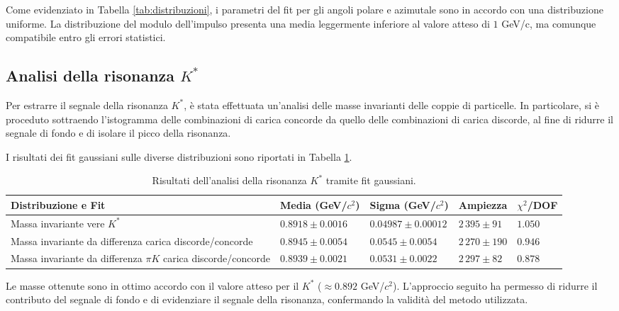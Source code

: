 \documentclass[a4paper,11pt]{article}
\begin{document}
Come evidenziato in Tabella \ref{tab:distribuzioni}, i parametri del fit per gli angoli polare e azimutale sono in accordo con una distribuzione uniforme. La distribuzione del modulo dell'impulso presenta una media leggermente inferiore al valore atteso di $1$ GeV/c, ma comunque compatibile entro gli errori statistici.

\subsection{Analisi della risonanza \( K^* \)}

Per estrarre il segnale della risonanza \( K^* \), è stata effettuata un'analisi delle masse invarianti delle coppie di particelle. In particolare, si è proceduto sottraendo l'istogramma delle combinazioni di carica concorde da quello delle combinazioni di carica discorde, al fine di ridurre il segnale di fondo e di isolare il picco della risonanza.

I risultati dei fit gaussiani sulle diverse distribuzioni sono riportati in Tabella \ref{tab:kstar}.

\begin{table}[h!]
    \centering
    \begin{tabular}{|m{2.5cm}|>{\centering\arraybackslash}m{2cm}|>{\centering\arraybackslash}m{2cm}|>{\centering\arraybackslash}m{2cm}|>{\centering\arraybackslash}m{1.5cm}|}
        \hline
        \textbf{Distribuzione e Fit} & \textbf{Media (GeV/$c^2$)} & \textbf{Sigma (GeV/$c^2$)} & \textbf{Ampiezza} & $\chi^2$/DOF \\
        \hline
        Massa invariante vere \( K^* \) & $0.8918 \pm 0.0016$ & $0.04987 \pm 0.00012$ & $2\,395 \pm 91$ & $1.050$ \\
        \hline
        Massa invariante da differenza carica discorde/concorde & $0.8945 \pm 0.0054$ & $0.0545 \pm 0.0054$ & $2\,270 \pm 190$ & $0.946$ \\
        \hline
        Massa invariante da differenza $\pi K$ carica discorde/concorde & $0.8939 \pm 0.0021$ & $0.0531 \pm 0.0022$ & $2\,297 \pm 82$ & $0.878$ \\
        \hline
    \end{tabular}
    \caption{Risultati dell'analisi della risonanza \( K^* \) tramite fit gaussiani.}
    \label{tab:kstar}
\end{table}

Le masse ottenute sono in ottimo accordo con il valore atteso per il \( K^* \) ($\approx 0.892$ GeV/$c^2$). L'approccio seguito ha permesso di ridurre il contributo del segnale di fondo e di evidenziare il segnale della risonanza, confermando la validità del metodo utilizzata.
\end{document}
